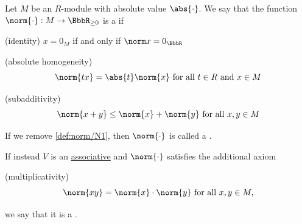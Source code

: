 \begin{definition}\label{def:norm}
  Let \( M \) be an \( R \)-module with absolute value \( \abs{\cdot} \). We say that the function \( \norm{\cdot}: M \to \BbbR_{\geq 0} \) is a  if
  \begin{thmenum}
    (identity) \( x = 0_M \) if and only if \( \norm x = 0_{\BbbR} \)

    (absolute homogeneity)
    \begin{equation*}
      \norm{t x} = \abs{t} \norm{x} \text{ for all } t \in R \text{ and } x \in M
    \end{equation*}

    (subadditivity)
    \begin{equation*}
      \norm{x + y} \leq \norm{x} + \norm{y} \text{ for all } x, y \in M
    \end{equation*}
  \end{thmenum}

  If we remove \cref{def:norm/N1}, then \( \norm{\cdot} \) is called a .

  If instead \( V \) is an \hyperref[def:algebra_over_semiring]{associative} and \( \norm{\cdot} \) satisfies the additional axiom
  \begin{thmenum}
    (multiplicativity)
    \begin{equation*}
      \norm{xy} = \norm{x} \cdot \norm{y} \text{ for all } x, y \in M,
    \end{equation*}
  \end{thmenum}
  we say that it is a .
\end{definition}

\begin{definition}\label{def:normed_vector}
\end{definition}

